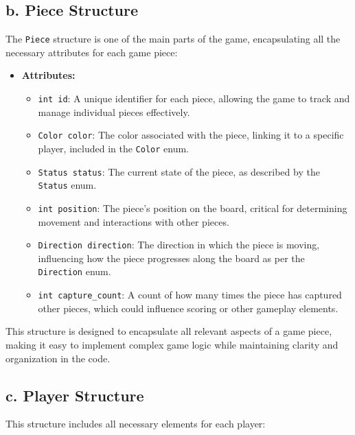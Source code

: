 \documentclass[a4paper,12pt]{article}
\begin{document}
\subsection*{b. Piece Structure}

The \texttt{Piece} structure is one of the main parts of the game, encapsulating all the necessary attributes for each game piece:

\begin{itemize}
    \item \textbf{Attributes:}
    \begin{itemize}
        \item \texttt{int id}: A unique identifier for each piece, allowing the game to track and manage individual pieces effectively.
        \item \texttt{Color color}: The color associated with the piece, linking it to a specific player, included in the \texttt{Color} enum.
        \item \texttt{Status status}: The current state of the piece, as described by the \texttt{Status} enum.
        \item \texttt{int position}: The piece's position on the board, critical for determining movement and interactions with other pieces.
        \item \texttt{Direction direction}: The direction in which the piece is moving, influencing how the piece progresses along the board as per the \texttt{Direction} enum.
        \item \texttt{int capture\_count}: A count of how many times the piece has captured other pieces, which could influence scoring or other gameplay elements.
    \end{itemize}
\end{itemize}

This structure is designed to encapsulate all relevant aspects of a game piece, making it easy to implement complex game logic while maintaining clarity and organization in the code.

\subsection*{c. Player Structure}

This structure includes all necessary elements for each player:
\end{document}
